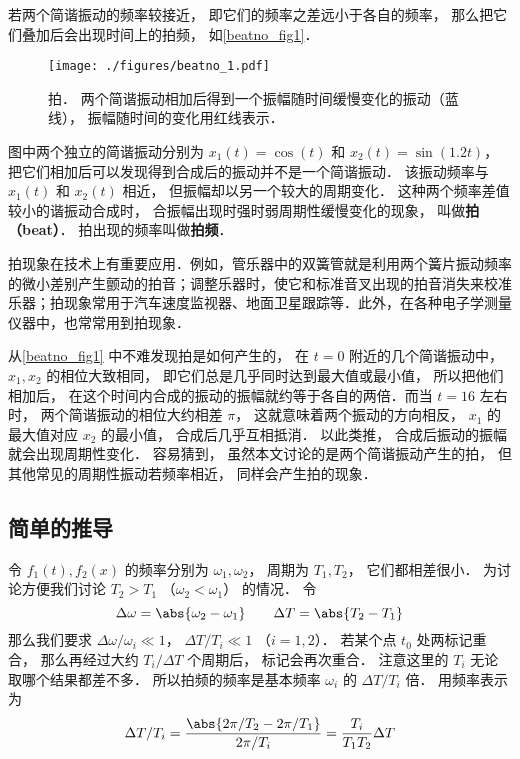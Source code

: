 
\begin{issues}
\issueDraft
\end{issues}


若两个简谐振动的频率较接近， 即它们的频率之差远小于各自的频率， 那么把它们叠加后会出现时间上的拍频， 如\autoref{beatno_fig1}．
\begin{figure}[ht]
\centering
\texttt{[image: ./figures/beatno\_1.pdf]}
\caption{拍． 两个简谐振动相加后得到一个振幅随时间缓慢变化的振动（蓝线）， 振幅随时间的变化用红线表示．} \label{beatno_fig1}
\end{figure}
图中两个独立的简谐振动分别为 $x_1(t) = \cos(t)$ 和 $x_2(t) = \sin(1.2t)$， 把它们相加后可以发现得到合成后的振动并不是一个简谐振动． 该振动频率与 $x_1(t)$ 和 $x_2(t)$ 相近， 但振幅却以另一个较大的周期变化． 这种两个频率差值较小的谐振动合成时， 合振幅出现时强时弱周期性缓慢变化的现象， 叫做\textbf{拍（beat）}． 拍出现的频率叫做\textbf{拍频}．

拍现象在技术上有重要应用．例如，管乐器中的双簧管就是利用两个簧片振动频率的微小差别产生颤动的拍音；调整乐器时，使它和标准音叉出现的拍音消失来校准乐器；拍现象常用于汽车速度监视器、地面卫星跟踪等．此外，在各种电子学测量仪器中，也常常用到拍现象．

从\autoref{beatno_fig1} 中不难发现拍是如何产生的， 在 $t = 0$ 附近的几个简谐振动中， $x_1, x_2$ 的相位大致相同， 即它们总是几乎同时达到最大值或最小值， 所以把他们相加后， 在这个时间内合成的振动的振幅就约等于各自的两倍．而当 $t = 16$ 左右时， 两个简谐振动的相位大约相差 $\pi$， 这就意味着两个振动的方向相反， $x_1$ 的最大值对应 $x_2$ 的最小值， 合成后几乎互相抵消． 以此类推， 合成后振动的振幅就会出现周期性变化．
容易猜到， 虽然本文讨论的是两个简谐振动产生的拍， 但其他常见的周期性振动若频率相近， 同样会产生拍的现象．

\subsection{简单的推导}

令 $f_1(t), f_2(x)$ 的频率分别为 $\omega_1, \omega_2$， 周期为 $T_1, T_2$， 它们都相差很小． 为讨论方便我们讨论 $T_2 > T_1$ （$\omega_2 < \omega_1$） 的情况． 令
\begin{equation}
\Delta \omega = \abs{\omega_2 - \omega_1}
\qquad
\Delta T = \abs{T_2 - T_1}
\end{equation}
那么我们要求 $\Delta \omega/\omega_i \ll 1$， $\Delta T/T_i \ll 1$ （$i = 1,2$）． 若某个点 $t_0$ 处两标记重合， 那么再经过大约 $T_i/\Delta T$ 个周期后， 标记会再次重合． 注意这里的 $T_i$ 无论取哪个结果都差不多． 所以拍频的频率是基本频率 $\omega_i$ 的 $\Delta T/T_i$ 倍． 用频率表示为
\begin{equation}
\Delta T/T_i = \frac{\abs{2\pi/T_2 - 2\pi/T_1}}{2\pi/T_i} = \frac{T_i}{T_1 T_2} \Delta T
\end{equation}


